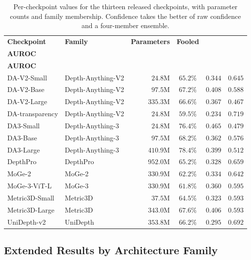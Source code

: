 \documentclass{article} %
\theoremstyle{defstyle}
\theoremstyle{plain}
\begin{document}
\begin{table}[htb]
\caption{Per-checkpoint values for the thirteen released checkpoints, with parameter counts and family membership. Confidence takes the better of raw confidence and a four-member ensemble.}
\label{tab:models}
\begin{center}
\footnotesize \setlength{\tabcolsep}{4pt}
\begin{tabular}{llrccc}
\toprule
\textbf{Checkpoint} & \textbf{Family} & \textbf{Parameters} & \textbf{Fooled} &
\shortstack{\textbf{Confidence}\\\textbf{AUROC}} & \shortstack{\textbf{Identifiability}\\\textbf{AUROC}} \\
\midrule
DA-V2-Small     & Depth-Anything-V2 & $24.8$M  & $65.2\%$ & $0.344$ & $0.645$ \\
DA-V2-Base      & Depth-Anything-V2 & $97.5$M  & $67.2\%$ & $0.408$ & $0.588$ \\
DA-V2-Large     & Depth-Anything-V2 & $335.3$M & $66.6\%$ & $0.367$ & $0.467$ \\
DA-transparency & Depth-Anything-V2 & $24.8$M  & $\mathbf{59.5\%}$ & $\mathbf{0.234}$ & $0.719$ \\
DA3-Small       & Depth-Anything-3  & $24.8$M  & $76.4\%$ & $0.465$ & $0.479$ \\
DA3-Base        & Depth-Anything-3  & $97.5$M  & $68.2\%$ & $0.362$ & $0.576$ \\
DA3-Large       & Depth-Anything-3  & $410.9$M & $\mathbf{78.4\%}$ & $0.399$ & $0.512$ \\
DepthPro        & DepthPro          & $952.0$M & $65.2\%$ & $0.328$ & $0.659$ \\
MoGe-2          & MoGe-2            & $330.9$M & $62.2\%$ & $0.334$ & $0.642$ \\
MoGe-3-ViT-L    & MoGe-3            & $330.9$M & $61.8\%$ & $0.360$ & $0.595$ \\
Metric3D-Small  & Metric3D          & $37.5$M  & $64.5\%$ & $0.323$ & $0.593$ \\
Metric3D-Large  & Metric3D          & $343.0$M & $67.6\%$ & $0.406$ & $0.593$ \\
UniDepth-v2     & UniDepth          & $353.8$M & $66.2\%$ & $0.295$ & $0.692$ \\
\bottomrule
\end{tabular}
\end{center}
\end{table}

\subsection{Extended Results by Architecture Family}
\label{sec:supp-family}
\end{document}
